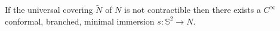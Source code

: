 \begin{theorem}
If the universal covering \(\tilde N\) of \(N\) is not contractible then there exists
a \(C^\infty\) conformal, branched, minimal immersion \(s: \mathbb{S}^2 \longrightarrow N\).
\end{theorem}


\iffalse


\fi
